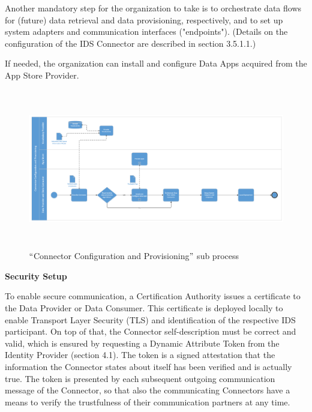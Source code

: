 Another mandatory step for the organization to take is to orchestrate data flows for (future) data retrieval and data provisioning, respectively, and to set up system adapters and communication interfaces ("endpoints"). (Details on the configuration of the IDS Connector are described in section 3.5.1.1.)

If needed, the organization can install and configure Data Apps acquired from the App Store Provider.



\begin{figure}[H]
	\begin{Center}
		\includegraphics[width=6.53in,height=2.74in]{./media/image23.PNG}
		\caption{ $``$Connector Configuration and Provisioning$"$  sub process}
		\label{ fig:_Connector_Configuration_and_Provisioning_sub_process}
	\end{Center}
\end{figure}



\textbf{Security Setup}

To enable secure communication, a Certification Authority issues a certificate to the Data Provider or Data Consumer. This certificate is deployed locally to enable Transport Layer Security (TLS) and identification of the respective IDS participant. On top of that, the Connector self-description must be correct and valid, which is ensured by requesting a Dynamic Attribute Token from the Identity Provider (section 4.1). The token is a signed attestation that the information the Connector states about itself has been verified and is actually true. The token is presented by each subsequent outgoing communication message of the Connector, so that also the communicating Connectors have a means to verify the trustfulness of their communication partners at any time.


